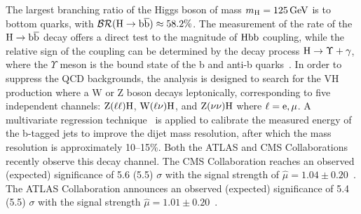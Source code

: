 The largest branching ratio of the Higgs boson of mass $m_{\mathrm{H}}=125\,\text{Ge\hspace{-.08em}V}$ is to bottom quarks, with $\mathcal{BR}(\mathrm{H}\to\mathrm{b}\overline{\mathrm{b}})\approx 58.2\%$. The measurement of the rate of the $\mathrm{H}\to \mathrm{b}\overline{\mathrm{b}}$ decay offers a direct test to the magnitude of $\mathrm{H}\mathrm{b}\mathrm{b}$ coupling, while the relative sign of the coupling can be determined by the decay process $\mathrm{H}\to\Upsilon +\gamma$, where the $\Upsilon$ meson is the bound state of the b and anti-b quarks~\cite{Bodwin:2013gca}. 
In order to suppress the QCD backgrounds, the analysis is designed to search for the VH production where a W or Z boson decays leptonically, corresponding to five independent channels: $\mathrm{Z}(\ell\ell)\mathrm{H}$, $\mathrm{W}(\ell\nu)\mathrm{H}$, and $\mathrm{Z}(\nu\nu)\mathrm{H}$ where $\ell=\mathrm{e}, \mu$. A multivariate regression technique~\cite{Aaltonen:2011bp,Khachatryan:2015ota,Aad:2014xzb} is applied to calibrate the measured energy of the b-tagged jets to improve the dijet mass resolution, after which the mass resolution is approximately 10--15\%. 
Both the ATLAS and CMS Collaborations recently observe this decay channel. The CMS Collaboration reaches an observed (expected) significance of 5.6 (5.5) $\sigma$ with the signal strength of $\hat{\mu}=1.04\pm 0.20$~\cite{Sirunyan:2018kst}. The ATLAS Collaboration announces an observed (expected) significance of 5.4 (5.5) $\sigma$ with the signal strength $\hat{\mu}=1.01\pm 0.20$~\cite{Aaboud:2018zhk}.


